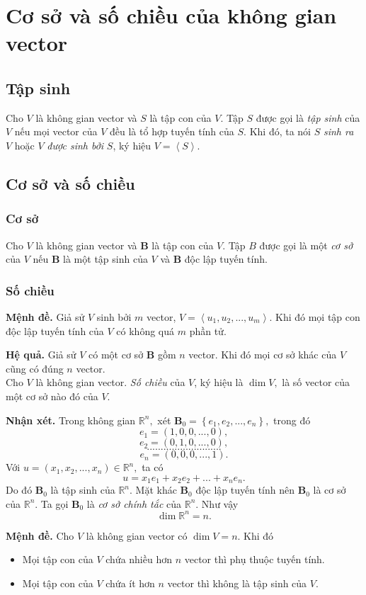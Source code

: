 \section{Cơ sở và số chiều của không gian vector}
\subsection{Tập sinh}
Cho $V$ là không gian vector và $S$ là tập con của $V.$ Tập $S$ được gọi là \textit{tập sinh} của $V$ nếu mọi vector của $V$ đều là tổ hợp tuyến tính của $S.$ Khi đó, ta nói $S$ \textit{sinh ra} $V$ hoặc $V$ \textit{được sinh bởi} $S$, ký hiệu $V = \left\langle S \right\rangle.$
\subsection{Cơ sở và số chiều}
\subsubsection{Cơ sở}
Cho $V$ là không gian vector và $\mathbf{B}$ là tập con của $V$. Tập $B$ được gọi là một \textit{cơ sở} của $V$ nếu $\mathbf{B}$ là một tập sinh của $V$ và $\mathbf{B}$ độc lập tuyến tính.
\subsubsection{Số chiều}
\begin{mybox}
\textbf{Mệnh đề.} Giả sử $V$ sinh bởi $m$ vector, $V = \left\langle {{u_1},{u_2},...,{u_m}} \right\rangle .$ Khi đó mọi tập con độc lập tuyến tính của $V$ có không quá $m$ phần tử.
\end{mybox}
\textbf{Hệ quả.} Giả sử $V$ có một cơ sở $\mathbf{B}$ gồm $n$ vector. Khi đó mọi cơ sở khác của $V$ cũng có đúng $n$ vector.\\
Cho $V$ là không gian vector. \textit{Số chiều} của $V$, ký hiệu là $\dim V,$ là số vector của một cơ sở nào đó của $V.$
\begin{mybox}
\textbf{Nhận xét.} Trong không gian $\mathbb{R}^n,$ xét ${\mathbf{B}_0} = \left\{ {{e_1},{e_2},...,{e_n}} \right\},$ trong đó
$${e_1} = \left( {1,0,0,...,0} \right),$$
$${e_2} = \left( {0,1,0,...,0} \right),$$
$$...........................$$
$${e_n} = \left( {0,0,0,...,1} \right).$$
Với $u = \left( {x_1, x_2, ..., x_n} \right)\in \mathbb{R}^n,$ ta có
$$u = {x_1}{e_1} + {x_2}{e_2} + ... + {x_n}{e_n}.$$
Do đó ${\mathbf{B}_0}$ là tập sinh của $\mathbb{R}^n.$ Mặt khác ${\mathbf{B}_0}$ độc lập tuyến tính nên ${\mathbf{B}_0}$ là cơ sở của $\mathbb{R}^n.$ Ta gọi ${\mathbf{B}_0}$ là \textit{cơ sở chính tắc} của $\mathbb{R}^n.$ Như vậy
$$\dim \mathbb{R}^n = n.$$
\end{mybox}
\begin{mybox}
\textbf{Mệnh đề.} Cho $V$ là không gian vector có $\dim V = n.$ Khi đó
\begin{itemize}
\item Mọi tập con của $V$ chứa nhiều hơn $n$ vector thì phụ thuộc tuyến tính.
\item Mọi tập con của $V$ chứa ít hơn $n$ vector thì không là tập sinh của $V.$
\end{itemize}
\end{mybox}
